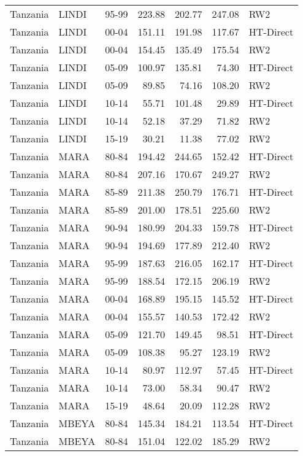 \begin{longtable}{lllrrrl}
  Tanzania & LINDI & 95-99 & 223.88 & 202.77 & 247.08 & RW2 \\ 
  Tanzania & LINDI & 00-04 & 151.11 & 191.98 & 117.67 & HT-Direct \\ 
  Tanzania & LINDI & 00-04 & 154.45 & 135.49 & 175.54 & RW2 \\ 
  Tanzania & LINDI & 05-09 & 100.97 & 135.81 & 74.30 & HT-Direct \\ 
  Tanzania & LINDI & 05-09 & 89.85 & 74.16 & 108.20 & RW2 \\ 
  Tanzania & LINDI & 10-14 & 55.71 & 101.48 & 29.89 & HT-Direct \\ 
  Tanzania & LINDI & 10-14 & 52.18 & 37.29 & 71.82 & RW2 \\ 
  Tanzania & LINDI & 15-19 & 30.21 & 11.38 & 77.02 & RW2 \\ 
  Tanzania & MARA & 80-84 & 194.42 & 244.65 & 152.42 & HT-Direct \\ 
  Tanzania & MARA & 80-84 & 207.16 & 170.67 & 249.27 & RW2 \\ 
  Tanzania & MARA & 85-89 & 211.38 & 250.79 & 176.71 & HT-Direct \\ 
  Tanzania & MARA & 85-89 & 201.00 & 178.51 & 225.60 & RW2 \\ 
  Tanzania & MARA & 90-94 & 180.99 & 204.33 & 159.78 & HT-Direct \\ 
  Tanzania & MARA & 90-94 & 194.69 & 177.89 & 212.40 & RW2 \\ 
  Tanzania & MARA & 95-99 & 187.63 & 216.05 & 162.17 & HT-Direct \\ 
  Tanzania & MARA & 95-99 & 188.54 & 172.15 & 206.19 & RW2 \\ 
  Tanzania & MARA & 00-04 & 168.89 & 195.15 & 145.52 & HT-Direct \\ 
  Tanzania & MARA & 00-04 & 155.57 & 140.53 & 172.42 & RW2 \\ 
  Tanzania & MARA & 05-09 & 121.70 & 149.45 & 98.51 & HT-Direct \\ 
  Tanzania & MARA & 05-09 & 108.38 & 95.27 & 123.19 & RW2 \\ 
  Tanzania & MARA & 10-14 & 80.97 & 112.97 & 57.45 & HT-Direct \\ 
  Tanzania & MARA & 10-14 & 73.00 & 58.34 & 90.47 & RW2 \\ 
  Tanzania & MARA & 15-19 & 48.64 & 20.09 & 112.28 & RW2 \\ 
  Tanzania & MBEYA & 80-84 & 145.34 & 184.21 & 113.54 & HT-Direct \\ 
  Tanzania & MBEYA & 80-84 & 151.04 & 122.02 & 185.29 & RW2 \\ 

\end{longtable}
